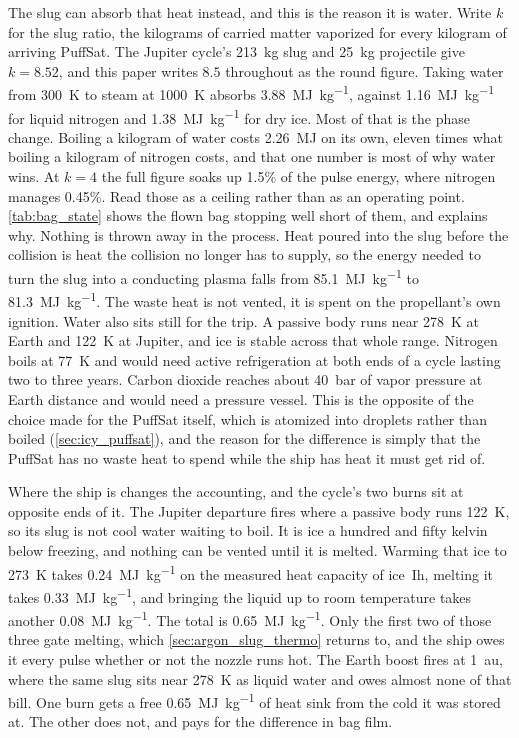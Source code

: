 \documentclass{article}
\begin{document}
The slug can absorb that heat instead, and this is the reason it is water. Write $k$ for the slug ratio, the kilograms of carried matter vaporized for every kilogram of arriving PuffSat. The Jupiter cycle's \SI{213}{\kilogram} slug and \SI{25}{\kilogram} projectile give $k = 8.52$, and this paper writes $8.5$ throughout as the round figure. Taking water from \SI{300}{\kelvin} to steam at \SI{1000}{\kelvin} absorbs \SI{3.88}{\mega\joule\per\kilogram}, against \SI{1.16}{\mega\joule\per\kilogram} for liquid nitrogen and \SI{1.38}{\mega\joule\per\kilogram} for dry ice. Most of that is the phase change. Boiling a kilogram of water costs \SI{2.26}{\mega\joule} on its own, eleven times what boiling a kilogram of nitrogen costs, and that one number is most of why water wins. At $k = 4$ the full figure soaks up 1.5\% of the pulse energy, where nitrogen manages 0.45\%. Read those as a ceiling rather than as an operating point. \autoref{tab:bag_state} shows the flown bag stopping well short of them, and explains why. Nothing is thrown away in the process. Heat poured into the slug before the collision is heat the collision no longer has to supply, so the energy needed to turn the slug into a conducting plasma falls from \SI{85.1}{\mega\joule\per\kilogram} to \SI{81.3}{\mega\joule\per\kilogram}. The waste heat is not vented, it is spent on the propellant's own ignition. Water also sits still for the trip. A passive body runs near \SI{278}{\kelvin} at Earth and \SI{122}{\kelvin} at Jupiter, and ice is stable across that whole range. Nitrogen boils at \SI{77}{\kelvin} and would need active refrigeration at both ends of a cycle lasting two to three years. Carbon dioxide reaches about \SI{40}{\bar} of vapor pressure at Earth distance and would need a pressure vessel. This is the opposite of the choice made for the PuffSat itself, which is atomized into droplets rather than boiled (\autoref{sec:icy_puffsat}), and the reason for the difference is simply that the PuffSat has no waste heat to spend while the ship has heat it must get rid of.

Where the ship is changes the accounting, and the cycle's two burns sit at opposite ends of it. The Jupiter departure fires where a passive body runs \SI{122}{\kelvin}, so its slug is not cool water waiting to boil. It is ice a hundred and fifty kelvin below freezing, and nothing can be vented until it is melted. Warming that ice to \SI{273}{\kelvin} takes \SI{0.24}{\mega\joule\per\kilogram} on the measured heat capacity of ice~Ih, melting it takes \SI{0.33}{\mega\joule\per\kilogram}, and bringing the liquid up to room temperature takes another \SI{0.08}{\mega\joule\per\kilogram}. The total is \SI{0.65}{\mega\joule\per\kilogram}. Only the first two of those three gate melting, which \autoref{sec:argon_slug_thermo} returns to, and the ship owes it every pulse whether or not the nozzle runs hot. The Earth boost fires at \SI{1}{\astronomicalunit}, where the same slug sits near \SI{278}{\kelvin} as liquid water and owes almost none of that bill. One burn gets a free \SI{0.65}{\mega\joule\per\kilogram} of heat sink from the cold it was stored at. The other does not, and pays for the difference in bag film.
\end{document}
